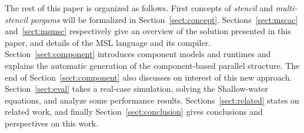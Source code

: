 The rest of this paper is organized as follows. First concepts of \emph{stencil} and \emph{multi-stencil porgams} will be formalized in Section~\ref{sect:concept}. Sections~\ref{sect:mscac} and~\ref{sect:msmsc} respectively give an overview of the solution presented in this paper, and details of the MSL language and its compiler. Section~\ref{sect:component} introduces component models and runtimes and explains the automatic generation of the component-based parallel structure. The end of Section~\ref{sect:component} also discusses on interest of this new approach. Section~\ref{sect:eval} takes a real-case simulation, solving the Shallow-water equations, and analyze some performance results. Sections~\ref{sect:related} states on related work, and finally Section~\ref{sect:conclusion} gives conclusions and perspectives on this work.